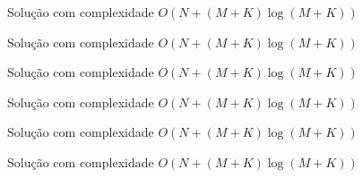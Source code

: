 \begin{frame}[fragile]{Solução com complexidade $O(N + (M + K)\log (M + K))$}
\end{frame}

\begin{frame}[fragile]{Solução com complexidade $O(N + (M + K)\log (M + K))$}
\end{frame}

\begin{frame}[fragile]{Solução com complexidade $O(N + (M + K)\log (M + K))$}
\end{frame}

\begin{frame}[fragile]{Solução com complexidade $O(N + (M + K)\log (M + K))$}
\end{frame}

\begin{frame}[fragile]{Solução com complexidade $O(N + (M + K)\log (M + K))$}
\end{frame}

\begin{frame}[fragile]{Solução com complexidade $O(N + (M + K)\log (M + K))$}
\end{frame}
